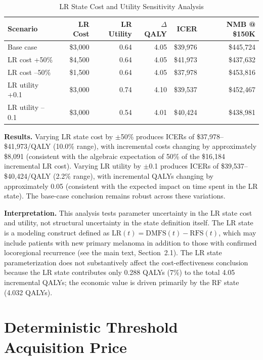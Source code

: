\documentclass[11pt,a4paper]{article}
\begin{document}
\begin{table}[H]
\centering
\caption{LR State Cost and Utility Sensitivity Analysis}
\label{tab:s17}
\begin{tabular*}{\textwidth}{@{\extracolsep{\fill}}lrrrrr}
\toprule
\textbf{Scenario} & \textbf{LR Cost} & \textbf{LR Utility} & \textbf{$\Delta$QALY} & \textbf{ICER} & \textbf{NMB @ \$150K} \\
\midrule
Base case & \$3,000 & 0.64 & 4.05 & \$39,976 & \$445,724 \\
LR cost +50\% & \$4,500 & 0.64 & 4.05 & \$41,973 & \$437,632 \\
LR cost --50\% & \$1,500 & 0.64 & 4.05 & \$37,978 & \$453,816 \\
LR utility +0.1 & \$3,000 & 0.74 & 4.10 & \$39,537 & \$452,467 \\
LR utility --0.1 & \$3,000 & 0.54 & 4.01 & \$40,424 & \$438,981 \\
\bottomrule
\end{tabular*}
\end{table}

\noindent \textbf{Results.} Varying LR state cost by $\pm$50\% produces ICERs of \$37,978--\$41,973/QALY (10.0\% range), with incremental costs changing by approximately \$8,091 (consistent with the algebraic expectation of 50\% of the \$16,184 incremental LR cost). Varying LR utility by $\pm$0.1 produces ICERs of \$39,537--\$40,424/QALY (2.2\% range), with incremental QALYs changing by approximately 0.05 (consistent with the expected impact on time spent in the LR state). The base-case conclusion remains robust across these variations.

\textbf{Interpretation.} This analysis tests parameter uncertainty in the LR state cost and utility, not structural uncertainty in the state definition itself. The LR state is a modeling construct defined as $\text{LR}(t) = \text{DMFS}(t) - \text{RFS}(t)$, which may include patients with new primary melanoma in addition to those with confirmed locoregional recurrence (see the main text, Section~2.1). The LR state parameterization does not substantively affect the cost-effectiveness conclusion because the LR state contributes only 0.288 QALYs (7\%) to the total 4.05 incremental QALYs; the economic value is driven primarily by the RF state (4.032 QALYs).

\section{Deterministic Threshold Acquisition Price}
\end{document}
